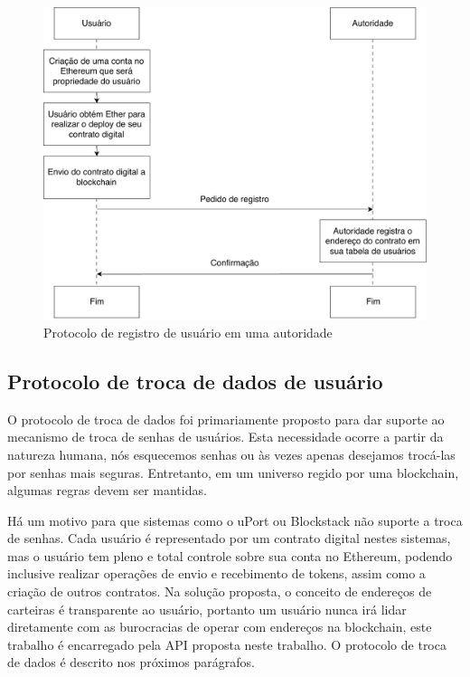 \documentclass[tcc,capa]{texufpel}
\begin{document}
        \begin{figure}[!h]
            \centering
            \includegraphics[width=15cm]{imagens/protocolo-registro.pdf}
            \caption{Protocolo de registro de usuário em uma autoridade}
            \label{fig:registro-contrato}
        \end{figure}
    
    \subsection{Protocolo de troca de dados de usuário}
    
        O protocolo de troca de dados foi primariamente proposto para dar suporte ao mecanismo de troca de senhas de usuários. Esta necessidade ocorre a partir da natureza humana, nós esquecemos senhas ou às vezes apenas desejamos trocá-las por senhas mais seguras. Entretanto, em um universo regido por uma blockchain, algumas regras devem ser mantidas.
        
        Há um motivo para que sistemas como o uPort ou Blockstack não suporte a troca de senhas. Cada usuário é representado por um contrato digital nestes sistemas, mas o usuário tem pleno e total controle sobre sua conta no Ethereum, podendo inclusive realizar operações de envio e recebimento de tokens, assim como a criação de outros contratos. Na solução proposta, o conceito de endereços de carteiras é transparente ao usuário, portanto um usuário nunca irá lidar diretamente com as burocracias de operar com endereços na blockchain, este trabalho é encarregado pela API proposta neste trabalho. O protocolo de troca de dados é descrito nos próximos parágrafos.
        
\end{document}
